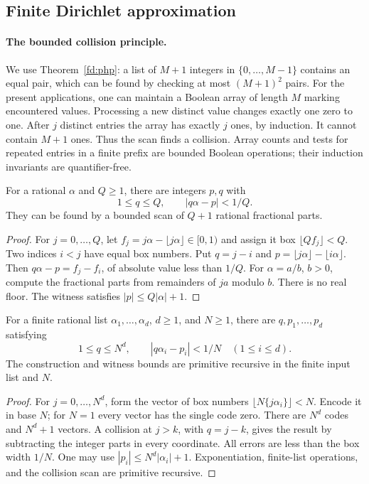 \subsection{Finite Dirichlet approximation}

\paragraph{The bounded collision principle.}
We use Theorem~\ref{fd:php}: a list of $M+1$ integers in
$\{0,\ldots,M-1\}$ contains an equal pair, which can be found by
checking at most $(M+1)^2$ pairs.
For the present applications, one can maintain a Boolean array of
length $M$ marking encountered values.
Processing a new distinct value changes exactly one zero to one.
After $j$ distinct entries the array has exactly $j$ ones, by induction.
It cannot contain $M+1$ ones. Thus the scan finds a collision.
Array counts and tests for repeated entries in a finite prefix are
bounded Boolean operations; their induction invariants are quantifier-free.

\begin{theorem}\label{dio:dirichlet}
For a rational $\alpha$ and $Q\geq1$, there are integers $p,q$ with
\[
 1\leq q\leq Q,\qquad |q\alpha-p|<1/Q.
\]
They can be found by a bounded scan of $Q+1$ rational fractional parts.
\end{theorem}
\begin{proof}
For $j=0,\ldots,Q$, let
$f_j=j\alpha-\lfloor j\alpha\rfloor\in[0,1)$ and assign it box
$\lfloor Qf_j\rfloor<Q$.
Two indices $i<j$ have equal box numbers. Put
$q=j-i$ and $p=\lfloor j\alpha\rfloor-\lfloor i\alpha\rfloor$.
Then $q\alpha-p=f_j-f_i$, of absolute value less than $1/Q$.
For $\alpha=a/b$, $b>0$, compute the fractional parts from
remainders of $ja$ modulo $b$. There is no real floor.
The witness satisfies $|p|\leq Q|\alpha|+1$.
\end{proof}

\begin{theorem}
\label{dio:simultaneous}
For a finite rational list $\alpha_1,\ldots,\alpha_d$, $d\geq1$,
and $N\geq1$, there are $q,p_1,\ldots,p_d$ satisfying
\[
 1\leq q\leq N^d,\qquad |q\alpha_i-p_i|<1/N
 \quad(1\leq i\leq d).
\]
The construction and witness bounds are primitive recursive in the
finite input list and $N$.
\end{theorem}
\begin{proof}
For $j=0,\ldots,N^d$, form the vector of box numbers
$\lfloor N\{j\alpha_i\}\rfloor<N$. Encode it in base $N$;
for $N=1$ every vector has the single code zero.
There are $N^d$ codes and $N^d+1$ vectors. A collision at $j>k$,
with $q=j-k$, gives the result by subtracting the integer parts in
every coordinate. All errors are less than the box width $1/N$.
One may use $|p_i|\leq N^d|\alpha_i|+1$.
Exponentiation, finite-list operations, and the collision scan are
primitive recursive.
\end{proof}

